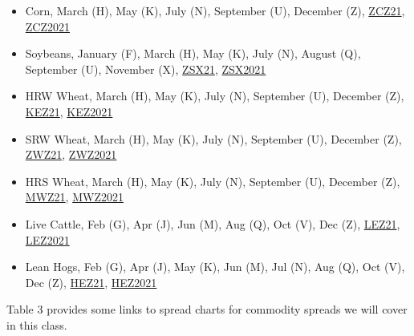 \documentclass[
]{book}
\begin{document}
\begin{itemize}
\item
  Corn, March (H), May (K), July (N), September (U), December (Z), \href{https://www.barchart.com/futures/quotes/ZCZ21/overview}{ZCZ21}, \href{www.tradingview.com}{ZCZ2021}
\item
  Soybeans, January (F), March (H), May (K), July (N), August (Q), September (U), November (X), \href{https://www.barchart.com/futures/quotes/ZSX21/overview}{ZSX21}, \href{www.tradingview.com}{ZSX2021}
\item
  HRW Wheat, March (H), May (K), July (N), September (U), December (Z), \href{https://www.barchart.com/futures/quotes/KEZ21/overview}{KEZ21}, \href{www.tradingview.com}{KEZ2021}
\item
  SRW Wheat, March (H), May (K), July (N), September (U), December (Z), \href{https://www.barchart.com/futures/quotes/ZWZ21/overview}{ZWZ21}, \href{https://wwwww.tradingview.com}{ZWZ2021}
\item
  HRS Wheat, March (H), May (K), July (N), September (U), December (Z), \href{https://www.barchart.com/futures/quotes/MWZ21/overview}{MWZ21}, \href{www.tradingview.com}{MWZ2021}
\item
  Live Cattle, Feb (G), Apr (J), Jun (M), Aug (Q), Oct (V), Dec (Z), \href{https://www.barchart.com/futures/quotes/LEZ21/overview}{LEZ21}, \href{https:/www.tradingview.com}{LEZ2021}
\item
  Lean Hogs, Feb (G), Apr (J), May (K), Jun (M), Jul (N), Aug (Q), Oct (V), Dec (Z), \href{httphttps://www.barchart.com/futures/quotes/HEZ21/overview}{HEZ21}, \href{https:/www.tradingview.com}{HEZ2021}
\end{itemize}

Table 3 provides some links to spread charts for commodity spreads we will cover in this class.
\end{document}
